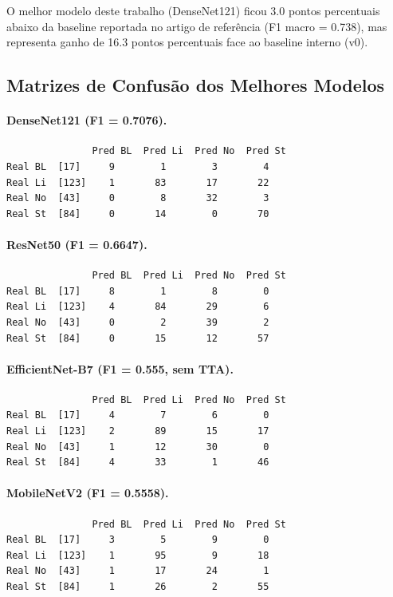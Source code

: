 \documentclass[runningheads]{llncs}
\begin{document}
O melhor modelo deste trabalho (DenseNet121) ficou 3.0 pontos percentuais
abaixo da baseline reportada no artigo de referência (F1 macro = 0.738), mas
representa ganho de 16.3 pontos percentuais face ao baseline interno (v0).

\subsection{Matrizes de Confusão dos Melhores Modelos}
\paragraph{DenseNet121 (F1 = 0.7076).}
\begin{verbatim}
			   Pred BL  Pred Li  Pred No  Pred St
Real BL  [17]     9        1        3        4
Real Li  [123]    1       83       17       22
Real No  [43]     0        8       32        3
Real St  [84]     0       14        0       70
\end{verbatim}

\paragraph{ResNet50 (F1 = 0.6647).}
\begin{verbatim}
			   Pred BL  Pred Li  Pred No  Pred St
Real BL  [17]     8        1        8        0
Real Li  [123]    4       84       29        6
Real No  [43]     0        2       39        2
Real St  [84]     0       15       12       57
\end{verbatim}

\paragraph{EfficientNet-B7 (F1 = 0.555, sem TTA).}
\begin{verbatim}
			   Pred BL  Pred Li  Pred No  Pred St
Real BL  [17]     4        7        6        0
Real Li  [123]    2       89       15       17
Real No  [43]     1       12       30        0
Real St  [84]     4       33        1       46
\end{verbatim}

\paragraph{MobileNetV2 (F1 = 0.5558).}
\begin{verbatim}
			   Pred BL  Pred Li  Pred No  Pred St
Real BL  [17]     3        5        9        0
Real Li  [123]    1       95        9       18
Real No  [43]     1       17       24        1
Real St  [84]     1       26        2       55
\end{verbatim}
\end{document}
